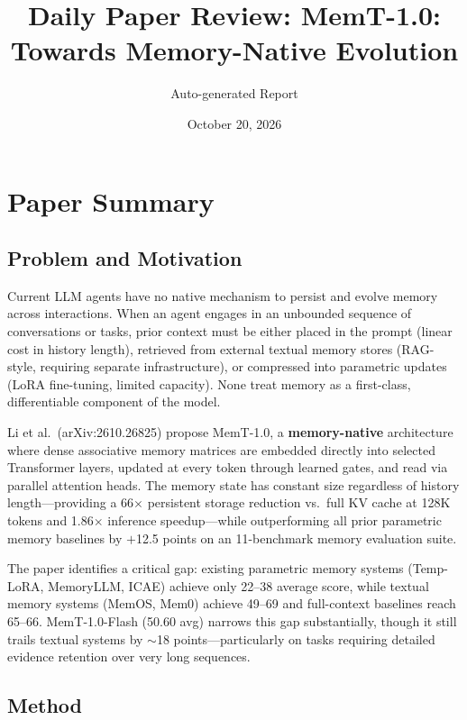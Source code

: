\documentclass[11pt,a4paper]{article}
\title{Daily Paper Review: MemT-1.0: Towards Memory-Native Evolution}
\author{Auto-generated Report}
\date{October 20, 2026}
\begin{document}
\maketitle

\section{Paper Summary}

\subsection{Problem and Motivation}
Current LLM agents have no native mechanism to persist and evolve memory across interactions. When an agent engages in an unbounded sequence of conversations or tasks, prior context must be either placed in the prompt (linear cost in history length), retrieved from external textual memory stores (RAG-style, requiring separate infrastructure), or compressed into parametric updates (LoRA fine-tuning, limited capacity). None treat memory as a first-class, differentiable component of the model.

Li et al.\ (arXiv:2610.26825) propose MemT-1.0, a \textbf{memory-native} architecture where dense associative memory matrices are embedded directly into selected Transformer layers, updated at every token through learned gates, and read via parallel attention heads. The memory state has constant size regardless of history length---providing a 66$\times$ persistent storage reduction vs.\ full KV cache at 128K tokens and 1.86$\times$ inference speedup---while outperforming all prior parametric memory baselines by $+$12.5 points on an 11-benchmark memory evaluation suite.

The paper identifies a critical gap: existing parametric memory systems (Temp-LoRA, MemoryLLM, ICAE) achieve only 22--38 average score, while textual memory systems (MemOS, Mem0) achieve 49--69 and full-context baselines reach 65--66. MemT-1.0-Flash (50.60 avg) narrows this gap substantially, though it still trails textual systems by $\sim$18 points---particularly on tasks requiring detailed evidence retention over very long sequences.

\subsection{Method}
\end{document}
